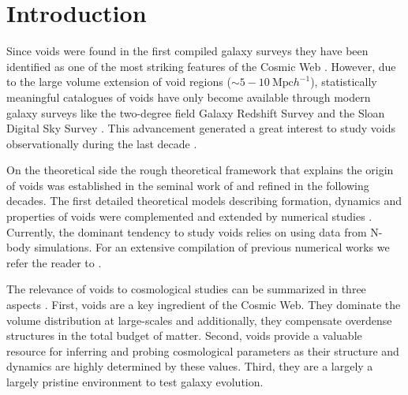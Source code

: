 \documentclass[a4,useAMS,usenatbib,usegraphicx]{latex/mn2e}
\begin{document}
\section{Introduction}
\label{sec:introduction}


Since voids were found in the first compiled galaxy surveys 
they have been identified as one of the most striking features of the
Cosmic Web \citep{Chincarini75,  Gregory78, Einasto80M, Einasto80N,
  Kirshner81, Zeldovich82,Kirshner87, Bond96}. 
However,  due to the large volume extension of void regions ($\sim
5-10\ \mbox{Mpc}  h^{-1}$), statistically meaningful catalogues of
voids \citep{Pan10,  Sutter12b, Nadathur14} have only become available
through  modern galaxy surveys like the two-degree field Galaxy
Redshift Survey \citep{ Colless01, Colless03} and the Sloan Digital
Sky Survey \citep{York00, Abazajian03}.
This advancement generated a great interest to study voids
observationally during the last decade \citep{Hoyle04, Croton04, Rojas05,
  Ceccarelli06, Patiri06a, Tikhonov06, Patiri06b,Tikhonov07,
  BendaBeckmann08, Foster09, Ceccarelli13, Sutter14a}. 


On the theoretical side the rough theoretical framework that explains
the origin of voids was established in the seminal work of
\citet{Zeldovich70} and refined in the following decades.  
The first detailed theoretical models describing formation, dynamics
and properties of  voids \citep{Hoffman82, Icke84, Bertschinger85,
  Blumenthal92} were  complemented and extended by numerical studies
\citep{Martel90, Regos91, Weygaert93, Dubinski93, Bond96}. 
Currently, the dominant tendency to study voids relies on using data
from N-body simulations. For an extensive compilation of previous 
numerical works we refer the reader to \citet{Colberg08}.


The relevance of voids to cosmological studies can be summarized in
three aspects \citep{Platen07}. 
First, voids are a key ingredient of the Cosmic Web. 
They dominate the volume distribution at large-scales and
additionally, they compensate overdense structures in the total budget
of  matter.  
Second, voids provide a valuable resource for inferring and probing 
cosmological parameters as their structure and dynamics are highly 
determined by these values. 
Third, they are a  largely a largely pristine environment to test
galaxy evolution.
\end{document}
